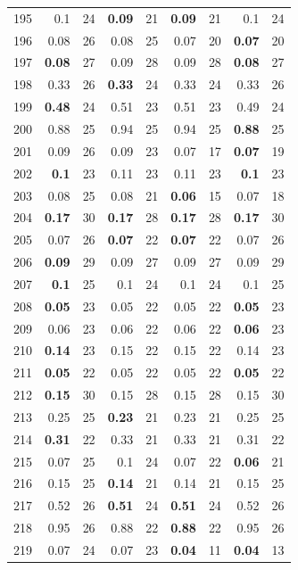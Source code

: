 \begin{longtable}{lr@{\hskip 4pt}l@{\hskip 12pt}r@{\hskip 4pt}l@{\hskip 12pt}r@{\hskip 4pt}l@{\hskip 12pt}r@{\hskip 4pt}l@{\hskip 12pt}}
195 & 0.1 & 24 & \textbf{0.09} & 21 & \textbf{0.09} & 21 & 0.1 & 24 \\
196 & 0.08 & 26 & 0.08 & 25 & 0.07 & 20 & \textbf{0.07} & 20 \\
197 & \textbf{0.08} & 27 & 0.09 & 28 & 0.09 & 28 & \textbf{0.08} & 27 \\
198 & 0.33 & 26 & \textbf{0.33} & 24 & 0.33 & 24 & 0.33 & 26 \\
199 & \textbf{0.48} & 24 & 0.51 & 23 & 0.51 & 23 & 0.49 & 24 \\
200 & 0.88 & 25 & 0.94 & 25 & 0.94 & 25 & \textbf{0.88} & 25 \\
201 & 0.09 & 26 & 0.09 & 23 & 0.07 & 17 & \textbf{0.07} & 19 \\
202 & \textbf{0.1} & 23 & 0.11 & 23 & 0.11 & 23 & \textbf{0.1} & 23 \\
203 & 0.08 & 25 & 0.08 & 21 & \textbf{0.06} & 15 & 0.07 & 18 \\
204 & \textbf{0.17} & 30 & \textbf{0.17} & 28 & \textbf{0.17} & 28 & \textbf{0.17} & 30 \\
205 & 0.07 & 26 & \textbf{0.07} & 22 & \textbf{0.07} & 22 & 0.07 & 26 \\
206 & \textbf{0.09} & 29 & 0.09 & 27 & 0.09 & 27 & 0.09 & 29 \\
207 & \textbf{0.1} & 25 & 0.1 & 24 & 0.1 & 24 & 0.1 & 25 \\
208 & \textbf{0.05} & 23 & 0.05 & 22 & 0.05 & 22 & \textbf{0.05} & 23 \\
209 & 0.06 & 23 & 0.06 & 22 & 0.06 & 22 & \textbf{0.06} & 23 \\
210 & \textbf{0.14} & 23 & 0.15 & 22 & 0.15 & 22 & 0.14 & 23 \\
211 & \textbf{0.05} & 22 & 0.05 & 22 & 0.05 & 22 & \textbf{0.05} & 22 \\
212 & \textbf{0.15} & 30 & 0.15 & 28 & 0.15 & 28 & 0.15 & 30 \\
213 & 0.25 & 25 & \textbf{0.23} & 21 & 0.23 & 21 & 0.25 & 25 \\
214 & \textbf{0.31} & 22 & 0.33 & 21 & 0.33 & 21 & 0.31 & 22 \\
215 & 0.07 & 25 & 0.1 & 24 & 0.07 & 22 & \textbf{0.06} & 21 \\
216 & 0.15 & 25 & \textbf{0.14} & 21 & 0.14 & 21 & 0.15 & 25 \\
217 & 0.52 & 26 & \textbf{0.51} & 24 & \textbf{0.51} & 24 & 0.52 & 26 \\
218 & 0.95 & 26 & 0.88 & 22 & \textbf{0.88} & 22 & 0.95 & 26 \\
219 & 0.07 & 24 & 0.07 & 23 & \textbf{0.04} & 11 & \textbf{0.04} & 13 \\

\end{longtable}
